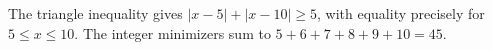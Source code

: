 The triangle inequality gives $|x-5|+|x-10|\ge5$, with equality precisely for $5\le x\le10$. The integer minimizers sum to $5+6+7+8+9+10=\boxed{45}$.
